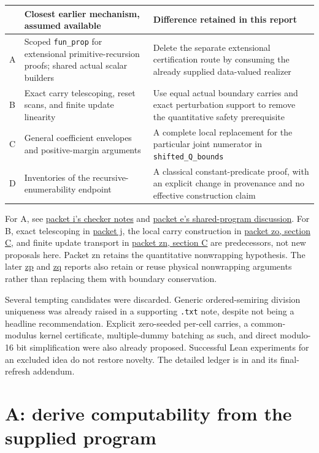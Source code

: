 \documentclass[11pt,a4paper]{article}
\newcommand{\code}[1]{\texttt{\small #1}}
\newcommand{\repo}{https://github.com/VladimirReshetnikov/ProveIt}
\newcommand{\pin}{60fcb2a69b7f1fdd4c3592ea5f164223cad50abe}
\newcommand{\prior}[3]{\href{\repo/blob/\pin/Computability/DiophantineConsistency/research/lean-proof-simplification/2026-10-26#1/#2}{#3}}
\begin{document}
\begin{tabularx}{\textwidth}{@{}L{12mm}Y Y@{}}
\toprule
 & Closest earlier mechanism, assumed available & Difference retained in this report \\
\midrule
A & Scoped \code{fun\_prop} for extensional primitive-recursion proofs; shared actual scalar builders & Delete the separate extensional certification route by consuming the already supplied data-valued realizer \\
B & Exact carry telescoping, reset scans, and finite update linearity & Use equal actual boundary carries and exact perturbation support to remove the quantitative safety prerequisite \\
C & General coefficient envelopes and positive-margin arguments & A complete local replacement for the particular joint numerator in \code{shifted\_Q\_bounds} \\
D & Inventories of the recursive-enumerability endpoint & A classical constant-predicate proof, with an explicit change in provenance and no effective construction claim \\
\bottomrule
\end{tabularx}

For A, see \prior{i}{notes/checker.md}{packet i's checker notes} and \prior{e}{report/report.tex}{packet e's shared-program discussion}. For B, exact telescoping in \prior{j}{report.tex}{packet j}, the local carry construction in \prior{zo}{report/report.tex}{packet zo, section C}, and finite update transport in \prior{zn}{report.tex}{packet zn, section C} are predecessors, not new proposals here. Packet zn retains the quantitative nonwrapping hypothesis. The later \prior{zp}{report.tex}{zp} and \prior{zq}{report.tex}{zq} reports also retain or reuse physical nonwrapping arguments rather than replacing them with boundary conservation.

Several tempting candidates were discarded. Generic ordered-semiring division uniqueness was already raised in a supporting \code{.txt} note, despite not being a headline recommendation. Explicit zero-seeded per-cell carries, a common-modulus kernel certificate, multiple-dummy batching as such, and direct modulo-16 bit simplification were also already proposed. Successful Lean experiments for an excluded idea do not restore novelty. The detailed ledger is in  and its final-refresh addendum.

\section{A: derive computability from the supplied program}
\end{document}
